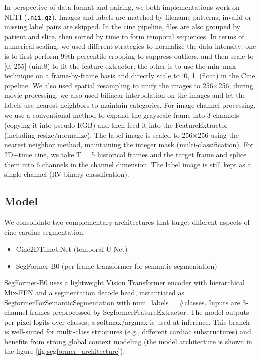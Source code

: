 \documentclass[twoside,11pt]{article}
\begin{document}
      In perspective of data format and pairing, we both implementations work on NIfTI (\texttt{.nii.gz}). Images and labels are matched by filename patterns; invalid or missing label pairs are skipped. In the cine pipeline, files are also grouped by patient and slice, then sorted by time to form temporal sequences.
      In terms of numerical scaling, we used different strategies to normalize the data intensity: one is to first perform 99th percentile cropping to suppress outliers, and then scale to [0, 255] (uint8) to fit the feature extractor; the other is to use the min–max technique on a frame-by-frame basis and directly scale to [0, 1] (float) in the Cine pipeline.
      We also used spatial resampling to unify the images to 256×256; during movie processing, we also used bilinear interpolation on the images and let the labels use nearest neighbors to maintain categories.
      For image channel processing, we use a conventional method to expand the grayscale frame into 3 channels (copying it into pseudo RGB) and then feed it into the FeatureExtractor (including resize/normalize). The label image is scaled to 256×256 using the nearest neighbor method, maintaining the integer mask (multi-classification). For 2D+time cine, we take T = 5 historical frames and the target frame and splice them into 6 channels in the channel dimension. The label image is still kept as a single channel (RV binary classification).

    \subsection{Model}

      We consolidate two complementary architectures that target different aspects of cine cardiac segmentation:

      \begin{itemize}
        \item Cine2DTimeUNet (temporal U-Net)
        \item SegFormer-B0 (per-frame transformer for semantic segmentation)
      \end{itemize}

      SegFormer-B0 uses a lightweight Vision Transformer encoder with hierarchical Mix-FFN and a segmentation decode head, instantiated as SegformerForSemanticSegmentation with num_labels = #classes. Inputs are 3-channel frames preprocessed by SegformerFeatureExtractor. The model outputs per-pixel logits over classes; a softmax/argmax is used at inference. This branch is well-suited for multi-class structures (e.g., different cardiac substructures) and benefits from strong global context modeling (the model architecture is shown in the figure \ref{fig:segformer_architecture}).
\end{document}
